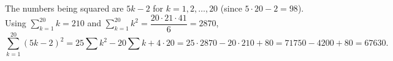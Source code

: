 The numbers being squared are $5k-2$ for $k=1,2,\dots,20$ (since $5\cdot20-2=98$). Using $\displaystyle\sum_{k=1}^{20}k=210$ and $\displaystyle\sum_{k=1}^{20}k^2=\dfrac{20\cdot21\cdot41}{6}=2870$,
\[\sum_{k=1}^{20}(5k-2)^2=25\sum k^2-20\sum k+4\cdot20=25\cdot2870-20\cdot210+80=71750-4200+80=\boxed{67630}.\]
